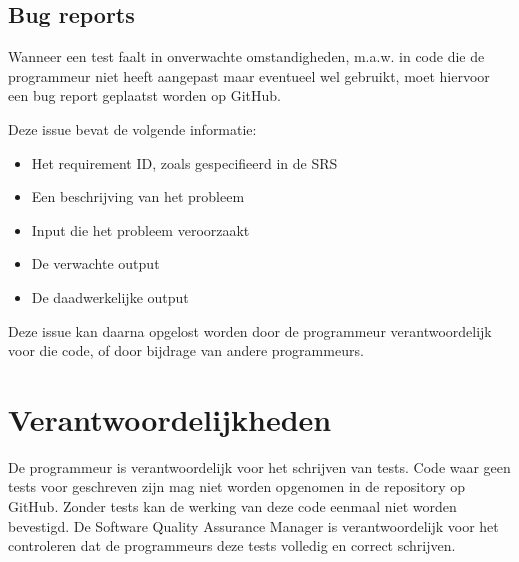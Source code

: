 \subsection{Bug reports}
Wanneer een test faalt in onverwachte omstandigheden, m.a.w. in code die de programmeur niet heeft aangepast maar eventueel wel gebruikt, moet hiervoor een bug report geplaatst worden op GitHub.

\noindent
Deze issue bevat de volgende informatie:
\begin{itemize}
	\item Het requirement ID, zoals gespecifieerd in de SRS\cite{srs}
	\item Een beschrijving van het probleem
	\item Input die het probleem veroorzaakt
	\item De verwachte output
	\item De daadwerkelijke output
\end{itemize}

Deze issue kan daarna opgelost worden door de programmeur verantwoordelijk voor die code, of door bijdrage van andere programmeurs.

\section{Verantwoordelijkheden}
De programmeur is verantwoordelijk voor het schrijven van tests. Code waar geen tests voor geschreven zijn mag niet worden opgenomen in de repository op GitHub. Zonder tests kan de werking van deze code eenmaal niet worden bevestigd. De Software Quality Assurance Manager is verantwoordelijk voor het controleren dat de programmeurs deze tests volledig en correct schrijven.
